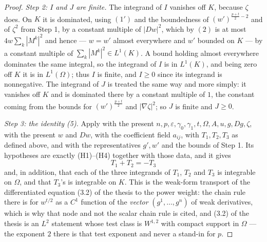 \begin{proof}
\emph{Step 2: $I$ and $J$ are finite.}  The integrand of $I$ vanishes off $K$,
because $\zeta$ does.  On $K$ it is dominated, using $(1')$ and the boundedness
of $(w')^{\frac{p+t}2-2}$ and of $\zeta^2$ from Step 1, by a constant multiple
of $|Dw|^2$, which by $(2)$ is at most $4w\sum_k|M^k|^2$ and hence --- $w=w'$
almost everywhere and $w'$ bounded on $K$ --- by a constant multiple of
$\sum_k|M^k|^2\in L^1(K)$.  A bound holding almost everywhere dominates the same
integral, so the integrand of $I$ is in $L^1(K)$, and being zero off $K$ it is
in $L^1(\Omega)$; thus $I$ is finite, and $I\ge0$ since its integrand is
nonnegative.  The integrand of $J$ is treated the same way and more simply: it
vanishes off $K$ and is dominated there by a constant multiple of $1$, the
constant coming from the bounds for $(w')^{\frac{p+t}2}$ and $|\nabla\zeta|^2$;
so $J$ is finite and $J\ge0$.

\emph{Step 3: the identity (5).}  Apply
 with the present
$n,p,\varepsilon,\gamma_0,\gamma_1,t,\Omega,A,u,g,Dg,\zeta$, with the present
$w$ and $Dw$, with the coefficient field $a_{ij}$, with $T_1,T_2,T_3$ as
defined above, and with the representatives $g',w'$ and the bounds of Step 1.
Its hypotheses are exactly (H1)--(H4) together with those data, and it gives
\[
T_1+T_2=-T_3
\tag{5}
\]
and, in addition, that each of the three integrands of $T_1$, $T_2$ and $T_3$
is integrable on $\Omega$, and that $T_3$'s is integrable on $K$.  This is the
weak-form transport of the differentiated equation (3.2) of the thesis to the power
weight: the chain rule there is for $w^{t/2}$ as a $C^1$ function of the
\emph{vector} $(g^1,\dots,g^n)$ of weak derivatives, which is why that node and
not the scalar chain rule is cited, and (3.2) of the thesis is an $L^2$ statement
whose test class is $W^{1,2}$ with compact support in $\Omega$ --- the exponent
$2$ there is that test exponent and never a stand-in for $p$.


\end{proof}
